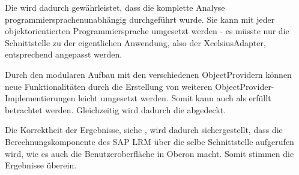 \begin{onehalfspacing}
Die  wird dadurch gewährleistet, dass die komplette Analyse programmiersprachenunabhängig durchgeführt wurde. Sie kann mit jeder objektorientierten Programmiersprache umgesetzt werden - es müsste nur die Schnittstelle zu der eigentlichen Anwendung, also der XcelsiusAdapter, entsprechend angepasst werden.



Durch den modularen Aufbau mit den verschiedenen ObjectProvidern können neue Funktionalitäten durch die Erstellung von weiteren ObjectProvider-Implementierungen leicht umgesetzt werden. Somit kann auch  als erfüllt betrachtet werden. Gleichzeitig wird dadurch die  abgedeckt.

Die Korrektheit der Ergebnisse, siehe , wird dadurch sichergestellt, dass die Berechnungskomponente des SAP LRM über die selbe Schnittstelle aufgerufen wird, wie es auch die Benutzeroberfläche in Oberon macht. Somit stimmen die Ergebnisse überein.


\end{onehalfspacing}
